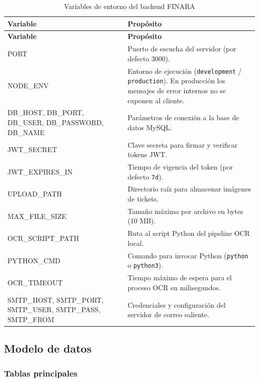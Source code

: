 \begin{longtable}{>{\ttfamily\small}p{4.2cm} p{9.3cm}}
  \caption{Variables de entorno del backend FINARA}
  \label{tab:env-backend} \\
  \toprule
  \normalfont\textbf{Variable} & \textbf{Propósito} \\
  \midrule
  \endfirsthead
  \toprule
  \normalfont\textbf{Variable} & \textbf{Propósito} \\
  \midrule
  \endhead
  PORT & Puerto de escucha del servidor (por defecto 3000). \\[3pt]
  NODE\_ENV & Entorno de ejecución (\texttt{development} /
    \texttt{production}). En producción los mensajes de error
    internos no se exponen al cliente. \\[3pt]
  DB\_HOST, DB\_PORT, DB\_USER, DB\_PASSWORD, DB\_NAME
    & Parámetros de conexión a la base de datos MySQL. \\[3pt]
  JWT\_SECRET & Clave secreta para firmar y verificar tokens JWT. \\[3pt]
  JWT\_EXPIRES\_IN & Tiempo de vigencia del token (por defecto \texttt{7d}). \\[3pt]
  UPLOAD\_PATH & Directorio raíz para almacenar imágenes de tickets. \\[3pt]
  MAX\_FILE\_SIZE & Tamaño máximo por archivo en bytes (10 MB). \\[3pt]
  OCR\_SCRIPT\_PATH & Ruta al script Python del pipeline OCR local. \\[3pt]
  PYTHON\_CMD & Comando para invocar Python (\texttt{python} o
    \texttt{python3}). \\[3pt]
  OCR\_TIMEOUT & Tiempo máximo de espera para el proceso OCR en
    milisegundos. \\[3pt]
  SMTP\_HOST, SMTP\_PORT, SMTP\_USER, SMTP\_PASS, SMTP\_FROM
    & Credenciales y configuración del servidor de correo saliente. \\
  \bottomrule
\end{longtable}

\subsection{Modelo de datos}

\subsubsection{Tablas principales}

